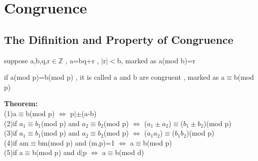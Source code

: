 \documentclass{ctexart}
\begin{document}
\newpage
\section{Congruence}
\subsection{The Difinition and Property of Congruence}

suppose a,b,q,r\(\in\)\(\mathbb{Z}\) , a=bq+r , \(\vert\)r\(\vert\)$<$b, marked as a(mod b)=r

if a(mod p)=b(mod p) , it is called a and b are congruent , marked as a\(\equiv\)b(mod p)

\vspace{12 pt}
\textbf{Theorem:}
\\(1)a\(\equiv\)b(mod p) \(\Leftrightarrow\) p\(\mid\)\(\pm\)(a-b)
\\(2)if \(a_1\)\(\equiv\)\(b_1\)(mod p) and \(a_2\)\(\equiv\)\(b_2\)(mod p) \(\Leftrightarrow\) (\(a_1\pm a_2\))\(\equiv\)(\(b_1\pm b_2\))(mod p)
\\(3)if \(a_1\)\(\equiv\)\(b_1\)(mod p) and \(a_2\)\(\equiv\)\(b_2\)(mod p) \(\Leftrightarrow\) (\(a_1a_2\))\(\equiv\)(\(b_1b_2\))(mod p)
\\(4)if am\(\equiv\)bm(mod p) and (m,p)=1 \(\Leftrightarrow\) a\(\equiv\)b(mod p)
\\(5)if a\(\equiv\)b(mod p) and d\(\mid\)p \(\Leftrightarrow\) a\(\equiv\)b(mod d)
\end{document}
